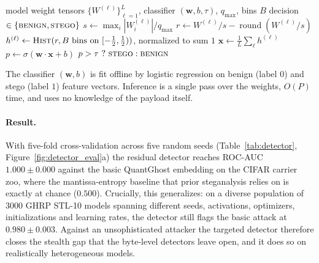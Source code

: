 \documentclass[a4paper,fleqn]{cas-dc}
\theoremstyle{plain}
\theoremstyle{remark}
\newcommand{\sys}{\mbox{QuantGhost}}
\begin{document}
\begin{algorithm}[t]
\caption{Sub-quantum residual steganalyzer}
\label{alg:detector}
\begin{algorithmic}[1]
\Require model weight tensors $\{W^{(\ell)}\}_{\ell=1}^{L}$, classifier $(\mathbf{w},b,\tau)$, $q_{\max}$, bins $B$
\Ensure decision $\in\{\textsc{benign},\textsc{stego}\}$
  \State $s \gets \max_i|W^{(\ell)}_i| / q_{\max}$
  \State $r \gets W^{(\ell)}/s - \operatorname{round}(W^{(\ell)}/s)$ \Comment{residual in $[-\tfrac12,\tfrac12)$}
  \State $h^{(\ell)} \gets \textsc{Hist}(r, B \text{ bins on } [-\tfrac12,\tfrac12))$, normalized to sum $1$
\EndFor
\State $\mathbf{x} \gets \tfrac{1}{L}\sum_{\ell} h^{(\ell)}$ 
\State $p \gets \sigma(\mathbf{w}\!\cdot\!\mathbf{x}+b)$ 
\State \Return $p>\tau\ ?\ \textsc{stego} : \textsc{benign}$
\end{algorithmic}
\end{algorithm}

The classifier $(\mathbf{w},b)$ is fit offline by logistic regression on benign (label $0$)
and stego (label $1$) feature vectors. Inference is a single pass over the weights, $O(P)$
time, and uses no knowledge of the payload itself.

\paragraph{Result.} With five-fold cross-validation across five random seeds
(Table~\ref{tab:detector}, Figure~\ref{fig:detector_eval}a) the residual detector reaches
ROC-AUC $1.000\pm0.000$ against the basic \sys{} embedding on the CIFAR carrier zoo, where
the mantissa-entropy baseline that prior steganalysis relies on is exactly at chance
($0.500$). Crucially, this generalizes: on a diverse population of $3000$ GHRP STL-10
models spanning different seeds, activations, optimizers, initializations and learning
rates, the detector still flags the basic attack at $0.980\pm0.003$. Against an
unsophisticated attacker the targeted detector therefore closes the stealth gap that the
byte-level detectors leave open, and it does so on realistically heterogeneous models.
\end{document}
